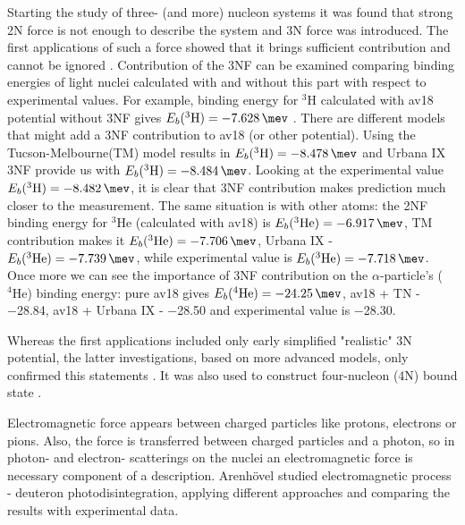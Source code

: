 Starting the study of three- (and more) nucleon systems it was found that 
strong 2N force is not enough to describe
the system and 3N force was introduced. The first applications of such
a force showed that it brings sufficient contribution and cannot be ignored \cite{GLOCKLE1982343}.
Contribution of the 3NF can be examined comparing binding energies of light nuclei calculated
with and without this part with respect to experimental values.  
For example, binding energy for $^3$H calculated with \gls{av18} potential
without 3NF gives $E_b(^3\mathrm{H}) = \SI{-7.628}{\mev}$ \cite{NoggaAV18}. There are different
models that might add a 3NF contribution to \gls{av18} (or other potential). 
Using the Tucson-Melbourne(TM) model \cite{Tucson-Melbourne}   results
in $E_b(^3\mathrm{H}) = \SI{-8.478}{\mev}$ and Urbana IX \cite{Urbana3NF} 3NF provide us with 
$E_b(^3\mathrm{H}) = \SI{-8.484}{\mev}$. 
Looking at the experimental value $E_b(^3\mathrm{H}) = \SI{-8.482}{\mev}$,
it is clear that 3NF contribution makes prediction much closer to the measurement.
The same situation is with other atoms: the 2NF binding energy for $^3$He (calculated with \gls{av18})
is $E_b(^3\mathrm{He}) = \SI{-6.917}{\mev}$, TM contribution makes it $E_b(^3\mathrm{He}) = \SI{-7.706}{\mev}$,
Urbana IX - $E_b(^3\mathrm{He}) = \SI{-7.739}{\mev}$, while experimental value
is $E_b(^3\mathrm{He}) = \SI{-7.718}{\mev}$.
Once more we can see the importance of 3NF contribution on the $\alpha$-particle's ($^4\mathrm{He}$) binding energy:
pure \gls{av18} gives $E_b(^4\mathrm{He}) = \SI{-24.25}{\mev}$, \gls{av18} + TN - \SI{-28.84}{\mev}, \gls{av18} + Urbana IX - \SI{-28.50}{\mev} and experimental value
is \SI{-28.30}{\mev}.

Whereas the first applications included only early simplified "realistic" 3N potential, the latter
investigations, based on more advanced models, only confirmed this statements \cite{StoksPhysRevC49, WIRINGAPhysRevC51}.
It was also used to construct four-nucleon (4N) bound state \cite{NoggaPhysRevLett}.

Electromagnetic force appears between charged particles like protons, electrons or pions.
Also, the force is transferred between charged particles and a photon, so 
in photon- and electron- scatterings on the nuclei an electromagnetic
force is necessary component of a description. Arenh\"{o}vel \cite{ArenhovelPhotodisint1991} 
studied electromagnetic process - deuteron photodisintegration,
applying different approaches and comparing the results with
experimental data.


